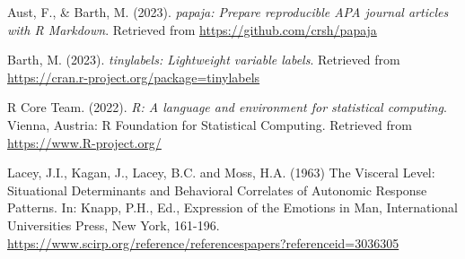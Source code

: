 \documentclass[
  man]{apa6}
\newlength{\cslhangindent}
\newlength{\cslentryspacingunit} %
\newenvironment{CSLReferences}[2] %
 {%
  \setlength{\parindent}{0pt}
  \ifodd #1
  \let\oldpar\par
  \def\par{\hangindent=\cslhangindent\oldpar}
  \fi
  \setlength{\parskip}{#2\cslentryspacingunit}
 }%
 {}
\begin{document}
\hypertarget{refs}{}
\begin{CSLReferences}{1}{0}
\leavevmode{}%
Aust, F., \& Barth, M. (2023). \emph{{papaja}: {Prepare} reproducible {APA} journal articles with {R Markdown}}. Retrieved from \url{https://github.com/crsh/papaja}

\leavevmode{}%
Barth, M. (2023). \emph{{tinylabels}: Lightweight variable labels}. Retrieved from \url{https://cran.r-project.org/package=tinylabels}

\leavevmode{}%
R Core Team. (2022). \emph{R: A language and environment for statistical computing}. Vienna, Austria: R Foundation for Statistical Computing. Retrieved from \url{https://www.R-project.org/}

\end{CSLReferences}

Lacey, J.I., Kagan, J., Lacey, B.C. and Moss, H.A. (1963) The Visceral Level: Situational Determinants and Behavioral Correlates of Autonomic Response Patterns. In: Knapp, P.H., Ed., Expression of the Emotions in Man, International Universities Press, New York, 161-196. \url{https://www.scirp.org/reference/referencespapers?referenceid=3036305}
\end{document}
